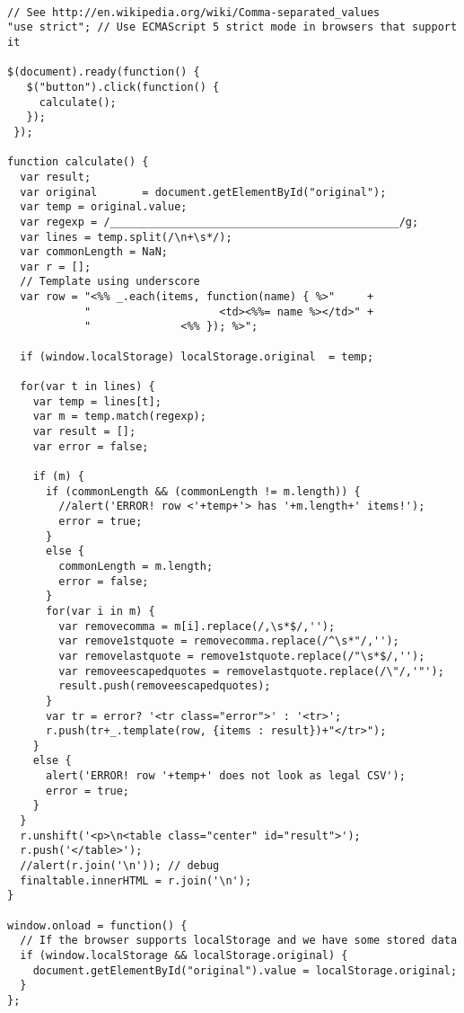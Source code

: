   \begin{latexonly}
    \begin{verbatim}

// See http://en.wikipedia.org/wiki/Comma-separated_values
"use strict"; // Use ECMAScript 5 strict mode in browsers that support it

$(document).ready(function() {
   $("button").click(function() {
     calculate();
   });
 });

function calculate() {
  var result;
  var original       = document.getElementById("original");
  var temp = original.value;
  var regexp = /_____________________________________________/g;
  var lines = temp.split(/\n+\s*/);
  var commonLength = NaN;
  var r = [];
  // Template using underscore
  var row = "<%% _.each(items, function(name) { %>"     +
            "                    <td><%%= name %></td>" +
            "              <%% }); %>";

  if (window.localStorage) localStorage.original  = temp;
  
  for(var t in lines) {
    var temp = lines[t];
    var m = temp.match(regexp);
    var result = [];
    var error = false;
    
    if (m) {
      if (commonLength && (commonLength != m.length)) {
        //alert('ERROR! row <'+temp+'> has '+m.length+' items!');
        error = true;
      }
      else {
        commonLength = m.length;
        error = false;
      }
      for(var i in m) {
        var removecomma = m[i].replace(/,\s*$/,'');
        var remove1stquote = removecomma.replace(/^\s*"/,'');
        var removelastquote = remove1stquote.replace(/"\s*$/,'');
        var removeescapedquotes = removelastquote.replace(/\"/,'"');
        result.push(removeescapedquotes);
      }
      var tr = error? '<tr class="error">' : '<tr>';
      r.push(tr+_.template(row, {items : result})+"</tr>");
    }
    else {
      alert('ERROR! row '+temp+' does not look as legal CSV');
      error = true;
    }
  }
  r.unshift('<p>\n<table class="center" id="result">');
  r.push('</table>');
  //alert(r.join('\n')); // debug
  finaltable.innerHTML = r.join('\n');
}

window.onload = function() {
  // If the browser supports localStorage and we have some stored data
  if (window.localStorage && localStorage.original) {
    document.getElementById("original").value = localStorage.original;
  }
};

    \end{verbatim}
  \end{latexonly}
